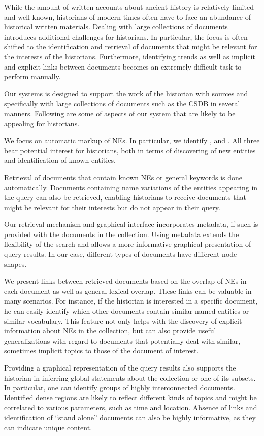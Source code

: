 While the amount of written accounts about ancient history is relatively limited and well known, historians of modern times often have to 
face an abundance of historical written materials. Dealing with large collections of documents introduces additional challenges for historians. 
In particular, the focus is often shifted to the identification and retrieval of documents that might be relevant for the interests of the 
historians. Furthermore, identifying trends as well as implicit and explicit links between documents becomes an extremely difficult task to 
perform manually.

Our systems is designed to support the work of the historian with sources and specifically with large collections of documents such as the 
CSDB in several manners. Following are some of aspects of our system that are likely to be appealing for historians.

We focus on automatic markup of NEs. In particular, we identify ,  and . All three bear potential 
interest for historians, both in terms of discovering of new entities and identification of known entities. 

Retrieval of documents that contain known NEs or general keywords is done automatically. Documents containing name variations of 
the entities appearing in the query can also be retrieved, enabling historians to receive documents that might be relevant for their interests 
but do not appear in their query. 

Our retrieval mechanism and graphical interface incorporates metadata, if such is provided with the documents in the collection. 
Using metadata extends the flexibility of the search and allows a more informative graphical presentation of query results. In our case, 
different types of documents have different node shapes. 

We present links between retrieved documents based on the overlap of NEs in each document as well as general lexical overlap. These links can be valuable in many scenarios. 
For instance, if the historian is interested in a specific document, he can easily identify which other documents contain similar named 
entities or similar vocabulary. This feature not only helps with the discovery of explicit information about NEs in the 
collection, but can also provide useful generalizations with regard to documents that potentially deal with similar, sometimes implicit 
topics to those of the document of interest.   

Providing a graphical representation of the query results also supports the historian in inferring global statements about the collection or 
one of its subsets. In particular, one can identify groups of highly interconnected documents. Identified dense regions are likely to reflect 
different kinds of topics and might be correlated to various parameters, such as time and location. Absence of links and identification of 
``stand alone'' documents can also be highly informative, as they can indicate unique content. 

